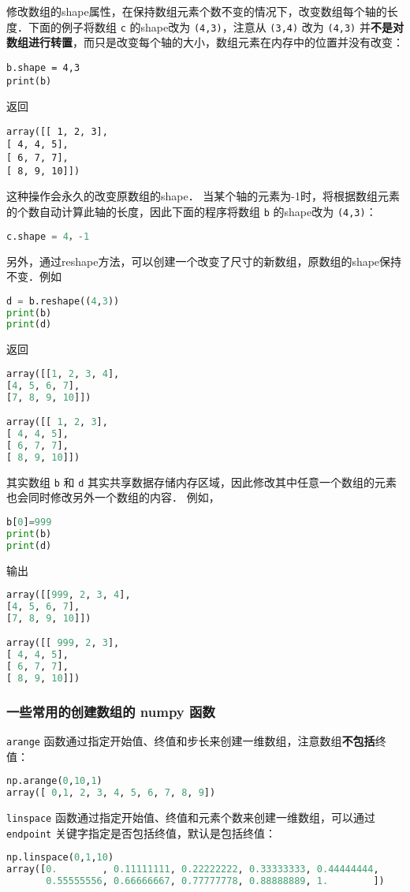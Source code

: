 修改数组的shape属性，在保持数组元素个数不变的情况下，改变数组每个轴的长度．下面的例子将数组 \verb|c| 的shape改为 \verb|(4,3)|，注意从 \verb|(3,4)| 改为 \verb|(4,3)| 并\textbf{不是对数组进行转置}，而只是改变每个轴的大小，数组元素在内存中的位置并没有改变：
\begin{lstlisting}
b.shape = 4,3
print(b)
\end{lstlisting}
返回
\begin{lstlisting}
array([[ 1, 2, 3],
[ 4, 4, 5],
[ 6, 7, 7],
[ 8, 9, 10]])
\end{lstlisting}
这种操作会永久的改变原数组的shape． 当某个轴的元素为-1时，将根据数组元素的个数自动计算此轴的长度，因此下面的程序将数组 \verb|b| 的shape改为 \verb|(4,3)|：
\begin{lstlisting}[language=python]
c.shape = 4，-1
\end{lstlisting}
另外，通过reshape方法，可以创建一个改变了尺寸的新数组，原数组的shape保持不变．例如
\begin{lstlisting}[language=python]
d = b.reshape((4,3))
print(b)
print(d)
\end{lstlisting}
返回
\begin{lstlisting}[language=python]
array([[1, 2, 3, 4],
[4, 5, 6, 7],
[7, 8, 9, 10]])

array([[ 1, 2, 3],
[ 4, 4, 5],
[ 6, 7, 7],
[ 8, 9, 10]])
\end{lstlisting}
其实数组 \verb|b| 和 \verb|d| 其实共享数据存储内存区域，因此修改其中任意一个数组的元素也会同时修改另外一个数组的内容． 例如，
\begin{lstlisting}[language=python]
b[0]=999
print(b)
print(d)
\end{lstlisting}
输出
\begin{lstlisting}[language=python]
array([[999, 2, 3, 4],
[4, 5, 6, 7],
[7, 8, 9, 10]])

array([[ 999, 2, 3],
[ 4, 4, 5],
[ 6, 7, 7],
[ 8, 9, 10]])
\end{lstlisting}


\subsubsection{一些常用的创建数组的 numpy 函数}
\verb|arange| 函数通过指定开始值、终值和步长来创建一维数组，注意数组\textbf{不包括}终值：
\begin{lstlisting}[language=python]
np.arange(0,10,1)
array([ 0,1, 2, 3, 4, 5, 6, 7, 8, 9])
\end{lstlisting}

\verb|linspace| 函数通过指定开始值、终值和元素个数来创建一维数组，可以通过 \verb|endpoint| 关键字指定是否包括终值，默认是包括终值：
 \begin{lstlisting}[language=python]
np.linspace(0,1,10)
array([0.        , 0.11111111, 0.22222222, 0.33333333, 0.44444444,
       0.55555556, 0.66666667, 0.77777778, 0.88888889, 1.        ])
 \end{lstlisting}

